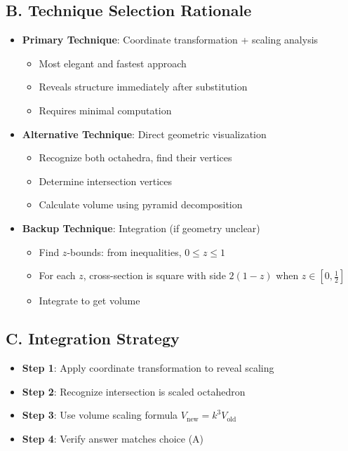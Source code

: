 \documentclass[11pt]{article}
\begin{document}
\begin{conversionbox}
\subsection*{B. Technique Selection Rationale}
\begin{itemize}[leftmargin=*]
    \item \textbf{Primary Technique}: Coordinate transformation + scaling analysis
    \begin{itemize}
        \item Most elegant and fastest approach
        \item Reveals structure immediately after substitution
        \item Requires minimal computation
    \end{itemize}
    \item \textbf{Alternative Technique}: Direct geometric visualization
    \begin{itemize}
        \item Recognize both octahedra, find their vertices
        \item Determine intersection vertices
        \item Calculate volume using pyramid decomposition
    \end{itemize}
    \item \textbf{Backup Technique}: Integration (if geometry unclear)
    \begin{itemize}
        \item Find $z$-bounds: from inequalities, $0 \le z \le 1$
        \item For each $z$, cross-section is square with side $2(1-z)$ when $z \in [0,\frac{1}{2}]$
        \item Integrate to get volume
    \end{itemize}
\end{itemize}

\subsection*{C. Integration Strategy}
\begin{itemize}[leftmargin=*]
    \item \textbf{Step 1}: Apply coordinate transformation to reveal scaling
    \item \textbf{Step 2}: Recognize intersection is scaled octahedron
    \item \textbf{Step 3}: Use volume scaling formula $V_{\text{new}} = k^3 V_{\text{old}}$
    \item \textbf{Step 4}: Verify answer matches choice (A)
\end{itemize}


\end{conversionbox}
\end{document}
